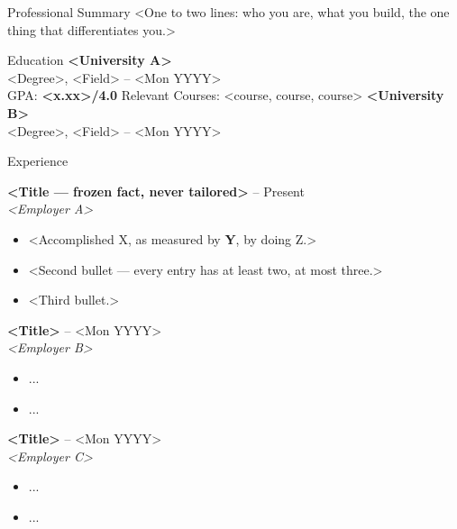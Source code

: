 \documentclass{resume}
\begin{document}
\fontsize{10.5}{12}\selectfont

\begin{rSection}{Professional Summary}
<One to two lines: who you are, what you build, the one thing that differentiates you.>
\end{rSection}

\begin{rSection}{Education}
\textbf{<University A>}  \\
<Degree>, <Field>  -- <Mon YYYY> \\
GPA: \textbf{<x.xx>/4.0} \quad Relevant Courses: <course, course, course>   %
\vspace{2pt}
\textbf{<University B>}  \\
<Degree>, <Field>  -- <Mon YYYY>
\end{rSection}

\begin{rSection}{Experience}

\textbf{<Title — frozen fact, never tailored>}  -- Present \\
\textit{<Employer A>} 
\begin{itemize}\itemsep -2pt
  \item <Accomplished X, as measured by \textbf{Y}, by doing Z.>
  \item <Second bullet — every entry has at least two, at most three.>
  \item <Third bullet.>
\end{itemize}

\textbf{<Title>}  -- <Mon YYYY> \\
\textit{<Employer B>} 
\begin{itemize}\itemsep -2pt
  \item ...
  \item ...
\end{itemize}

\textbf{<Title>}  -- <Mon YYYY> \\
\textit{<Employer C>} 
\begin{itemize}\itemsep -2pt
  \item ...
  \item ...
\end{itemize}

\end{rSection}
\end{document}
